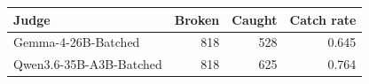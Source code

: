 \begin{tabular}{lrrr}
\toprule
Judge & Broken & Caught & Catch rate \\
\midrule
Gemma-4-26B-Batched & 818 & 528 & 0.645 \\
Qwen3.6-35B-A3B-Batched & 818 & 625 & 0.764 \\
\bottomrule
\end{tabular}
